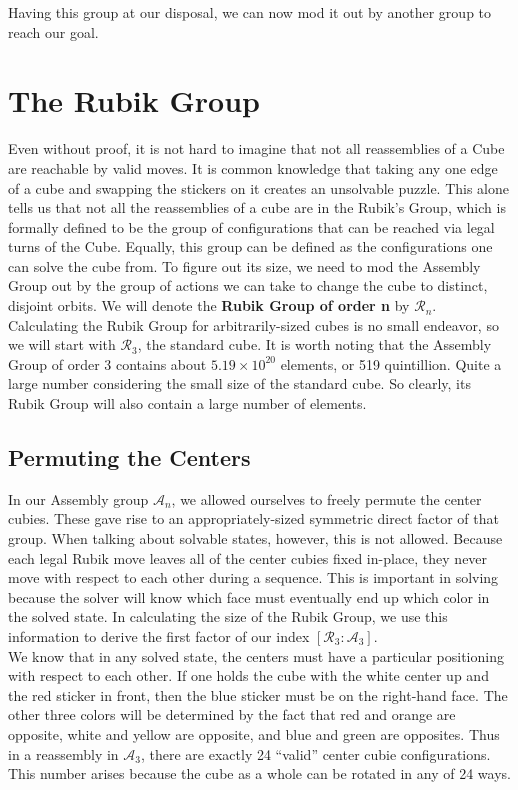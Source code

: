 \documentclass[10pt,letterpaper]{report}
\begin{document}
Having this group at our disposal, we can now mod it out by another group to reach our goal.
\section{The Rubik Group}
Even without proof, it is not hard to imagine that not all reassemblies of a Cube are reachable by valid moves.  It is common knowledge that taking any one edge of a cube and swapping the stickers on it creates an unsolvable puzzle.  This alone tells us that not all the reassemblies of a cube are in the Rubik's Group, which is formally defined to be the group of configurations that can be reached via legal turns of the Cube.  Equally, this group can be defined as the configurations one can solve the cube from.  To figure out its size, we need to mod the Assembly Group out by the group of actions we can take to change the cube to distinct, disjoint orbits.  We will denote the \textbf{Rubik Group of order n} by $\mathcal{R}_n$. \\

Calculating the Rubik Group for arbitrarily-sized cubes is no small endeavor, so we will start with $\mathcal{R}_3$, the standard cube.  It is worth noting that the Assembly Group of order 3 contains about $5.19 \times 10^{20}$ elements, or 519 quintillion.  Quite a large number considering the small size of the standard cube.  So clearly, its Rubik Group will also contain a large number of elements.

\subsection{Permuting the Centers}

In our Assembly group $\mathcal{A}_n$, we allowed ourselves to freely permute the center cubies.  These gave rise to an appropriately-sized symmetric direct factor of that group.  When talking about solvable states, however, this is not allowed.  Because each legal Rubik move leaves all of the center cubies fixed in-place, they never move with respect to each other during a sequence.  This is important in solving because the solver will know which face must eventually end up which color in the solved state.  In calculating the size of the Rubik Group, we use this information to derive the first factor of our index $[\mathcal{R}_3 : \mathcal{A}_3]$. \\

We know that in any solved state, the centers must have a particular positioning with respect to each other.  If one holds the cube with the white center up and the red sticker in front, then the blue sticker must be on the right-hand face.  The other three colors will be determined by the fact that red and orange are opposite, white and yellow are opposite, and blue and green are opposites.  Thus in a reassembly in $\mathcal{A}_3$, there are exactly 24 ``valid'' center cubie configurations.  This number arises because the cube as a whole can be rotated in any of 24 ways. \\
\end{document}
